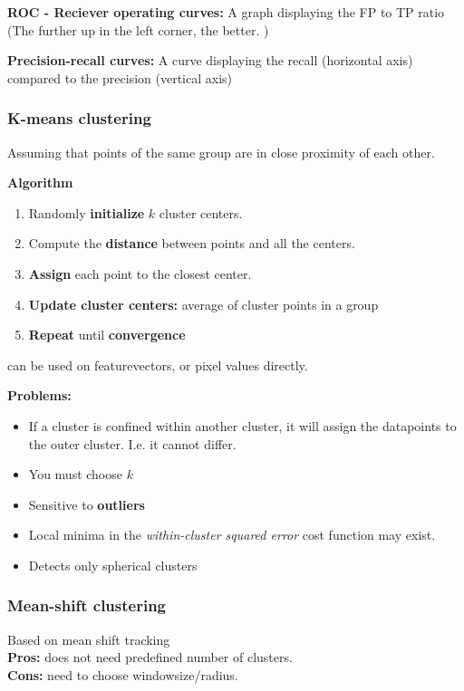 \documentclass[a4paper]{article}
\begin{document}
\textbf{ROC - Reciever operating curves:} 
A graph displaying the FP to TP ratio (The further up in the left corner, the better. )

\textbf{Precision-recall curves:} 
A curve displaying the recall (horizontal axis) compared to the precision (vertical axis)

\subsubsection{K-means clustering}
Assuming that points of the same group are in close proximity of each other. 

\textbf{Algorithm} 
\begin{enumerate}
	\item Randomly \textbf{initialize} $ k $ cluster centers.
	\item Compute the \textbf{distance} between points and all the centers. 
	\item \textbf{Assign}  each point to the closest center. 
	\item \textbf{Update cluster centers:} average of cluster points in a group
	\item \textbf{Repeat} until \textbf{convergence}  
\end{enumerate}

can be used on featurevectors, or pixel values directly.

\textbf{Problems:} 
\begin{itemize}
	\item If a cluster is confined within another cluster, it will assign the datapoints to the outer cluster. I.e. it cannot differ. 
	\item You must choose $ k $
	\item Sensitive to \textbf{outliers} 
	\item Local minima in the \textit{within-cluster squared error} cost function may exist. 
	\item Detects only spherical clusters
\end{itemize}

\subsubsection{Mean-shift clustering}
Based on mean shift tracking \\
\textbf{Pros:} does not need predefined number of clusters. \\
\textbf{Cons:} need to choose windowsize/radius. 
\end{document}
